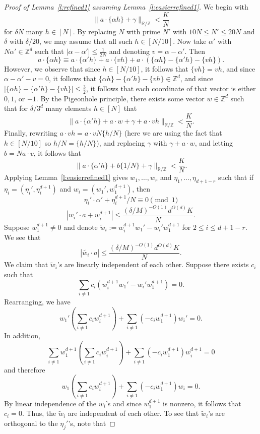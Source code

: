 \documentclass[11pt, a4paper]{amsart}
\theoremstyle{plain}
\theoremstyle{plain}
\theoremstyle{definition}
\theoremstyle{remark}
\numberwithin{equation}{section}
\numberwithin{lemma}{section}
\numberwithin{proposition}{section}
\numberwithin{corollary}{section}
\numberwithin{definition}{section}
\numberwithin{claim}{section}
\begin{document}
\begin{proof}[Proof of Lemma~\ref{l:refined1} assuming Lemma~\ref{l:easierrefined1}]
We begin with
$$\|a \cdot \{\alpha h\} + \gamma\|_{\mathbb{R}/\mathbb{Z}} < \frac{K}{N}$$
for $\delta N$ many $h \in [N]$. By replacing $N$ with prime $N'$ with $10N \le N' \le 20N$ and $\delta$ with $\delta/20$, we may assume that all such $h \in [N/10]$. Now take $\alpha'$ with $N\alpha'\in\mathbb{Z}^d$ such that $|\alpha - \alpha'| \le \frac{1}{2N}$ and denoting $v = \alpha - \alpha'$. Then
$$a \cdot \{\alpha h\} \equiv a \cdot \{\alpha' h\} + a \cdot \{v h\} + a \cdot (\{\alpha h\} - \{\alpha' h\} - \{v h\}).$$
However, we observe that since $h \in [N/10]$, it follows that $\{vh\} = vh$, and since $\alpha - \alpha' - v = 0$, it follows that $\{\alpha h\} - \{\alpha' h\} - \{vh\} \in \mathbb{Z}^{d}$, and since $|\{\alpha h\} - \{\alpha' h\} - \{vh\}| \le \frac{3}{2}$, it follows that each coordinate of that vector is either $0, 1$, or $-1$. By the Pigeonhole principle, there exists some vector $w \in \mathbb{Z}^{d}$ such that for $\delta/3^{d}$ many elements $h \in [N]$ that
$$\|a \cdot \{\alpha' h\} + a \cdot w + \gamma + a \cdot vh \|_{\mathbb{R}/\mathbb{Z}} < \frac{K}{N}.$$
Finally, rewriting $a \cdot v h = a \cdot v N\{h/N\}$ (here we are using the fact that $h \in [N/10]$ so $h/N = \{h/N\}$), and replacing $\gamma$ with $\gamma + a \cdot w$, and letting $b = Na \cdot v$, it follows that
$$\|a \cdot \{\alpha' h\} + b\{1/N\} + \gamma\|_{\mathbb{R}/\mathbb{Z}} < \frac{K}{N}.$$
Applying Lemma~\ref{l:easierrefined1} gives $w_1, \dots, w_r$ and $\eta_1, \dots, \eta_{d + 1 - r}$ such that if $\eta_i = (\eta_i', \eta_i^{d+1})$ and $w_i = (w_1', w_1^{d+1})$, then 
$$\eta_i' \cdot \alpha' + \eta_i^{d+1} /N \equiv 0 \pmod{1}$$
$$|w_i' \cdot a + w_i^{d+1}| \le \frac{(\delta/M)^{-O(1)}d^{O(d)}K}{N}.$$
Suppose $w_1^{d+1} \neq 0$ and denote $\tilde{w}_i := w_i^{d+1} w_1' - w_i'w_1^{d+1}$ for $2 \le i \le d + 1 - r$. We see that 
$$|\tilde{w_i} \cdot a| \le \frac{(\delta/M)^{-O(1)}d^{O(d)}K}{N}.$$
We claim that $\tilde{w}_i$'s are linearly independent of each other. Suppose there exists $c_i$ such that
$$\sum_{i \neq 1} c_i(w_i^{d+1} w_1' - w_i'w_1^{d+1}) = 0.$$
Rearranging, we have
$$w_1'\left(\sum_{i \neq 1} c_i w_i^{d+1} \right) + \sum_{i \neq 1} (-c_i w_1^{d+1})w_i' = 0.$$
In addition,
$$\sum_{i \neq 1} w_1^{d+1}\left(\sum_{i \neq 1} c_i w_i^{d+1} \right) + \sum_{i \neq 1} (-c_i w_1^{d+1})w_i^{d+1} = 0$$
and therefore
$$w_1\left(\sum_{i \neq 1} c_i w_i^{d+1} \right) + \sum_{i \neq 1} (-c_i w_1^{d+1})w_i = 0.$$
By linear independence of the $w_i$'s and since $w_1^{d+1}$ is nonzero, it follows that $c_i = 0$. Thus, the $\tilde{w}_i$ are independent of each other. To see that $\tilde{w}_i$'s are orthogonal to the $\eta_j'$'s, note that

\end{proof}
\end{document}
